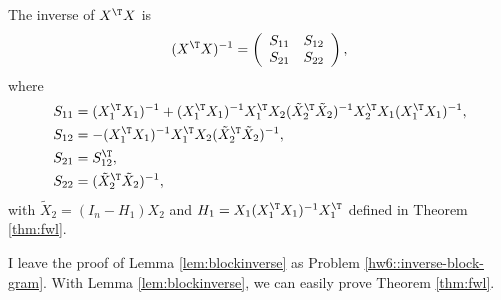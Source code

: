 \begin{lemma}
\label{lem:blockinverse}The inverse of $X^{\T}X$ is
\[
(X^{\T}X)^{-1}=\left(\begin{array}{cc}
 S_{11}  &  S_{12} \\
 S_{21}  &  S_{22} 
\end{array}\right),
\]
 where 
\begin{align*}
 S_{11}  & =(X_{1}^{\T}X_{1})^{-1}+(X_{1}^{\T}X_{1})^{-1}X_{1}^{\T}X_{2}(\tilde{X}_{2}^{\T}\tilde{X}_{2})^{-1}X_{2}^{\T}X_{1}(X_{1}^{\T}X_{1})^{-1},\\
 S_{12}  & =-(X_{1}^{\T}X_{1})^{-1}X_{1}^{\T}X_{2}(\tilde{X}_{2}^{\T}\tilde{X}_{2})^{-1},\\
 S_{21}  & = S_{12}^{\T},\\
 S_{22}  & =(\tilde{X}_{2}^{\T}\tilde{X}_{2})^{-1},
\end{align*}
with $\tilde{X}_{2}=(I_{n}-H_{1})X_{2}$ and $H_{1}=X_{1}(X_{1}^{\T}X_{1})^{-1}X_{1}^{\T}$ defined in Theorem \ref{thm:fwl}. 
\end{lemma}




I leave the proof of Lemma \ref{lem:blockinverse} as Problem \ref{hw6::inverse-block-gram}. With Lemma \ref{lem:blockinverse}, we can easily prove Theorem \ref{thm:fwl}.


